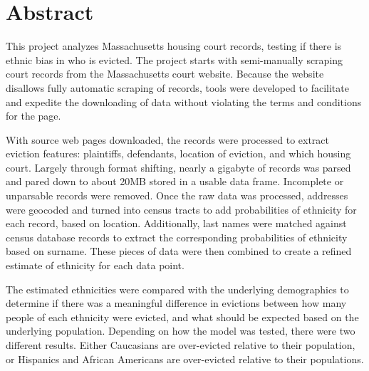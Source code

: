 

\chapter*{Abstract}
\thispagestyle{empty}	%

This project analyzes Massachusetts housing court records, testing if there is ethnic bias in who is evicted.  The project starts with semi-manually scraping court records from the Massachusetts court website.  Because the website disallows fully automatic scraping of records, tools were developed to facilitate and expedite the downloading of data without violating the terms and conditions for the page. \par

With source web pages downloaded, the records were processed to extract eviction features: plaintiffs, defendants, location of eviction, and which housing court.  Largely through format shifting, nearly a gigabyte of records was parsed and pared down to about 20MB stored in a usable data frame.  Incomplete or unparsable records were removed. Once the raw data was processed, addresses were geocoded and turned into census tracts to add probabilities of ethnicity for each record, based on location.  Additionally, last names were matched against census database records to extract the corresponding probabilities of ethnicity based on surname.  These pieces of data were then combined to create a refined estimate of ethnicity for each data point. \par

The estimated ethnicities were compared with the underlying demographics to determine if there was a meaningful difference in evictions between how many people of each ethnicity were evicted, and what should be expected based on the underlying population. Depending on how the model was tested, there were two different results.  Either Caucasians are over-evicted relative to their population, or Hispanics and African Americans are over-evicted relative to their populations.


